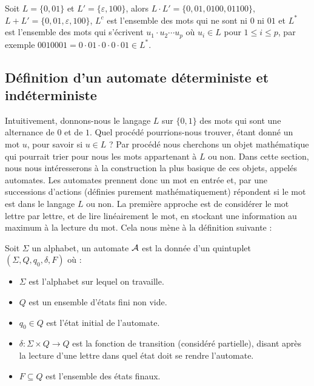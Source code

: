 \begin{expl}
    Soit $L = \{0,01\}$ et $L' = \{\varepsilon,100\}$, alors $L\cdot L' = \{0,01,0100,01100\}$, $L+L' = \{0,01,\varepsilon,100\}$, $L^c$ est l'ensemble des mots qui ne sont ni $0$ ni $01$ et $L^*$ est l'ensemble des mots qui s'écrivent $u_1\cdot u_2\cdots u_p$ où $u_i\in L$ pour $1\leq i \leq p$, par exemple $0010001 = 0\cdot 01 \cdot 0\cdot 0 \cdot 01 \in L^*$.
\end{expl}

\subsection{Définition d'un automate déterministe et indéterministe}

Intuitivement, donnons-nous le langage $L$ sur $\{0,1\}$ des mots qui sont une alternance de $0$ et de $1$. Quel procédé pourrions-nous trouver, étant donné un mot $u$, pour savoir si $u\in L$ ? Par procédé nous cherchons un objet mathématique qui pourrait trier pour nous les mots appartenant à $L$ ou non. Dans cette section, nous nous intéresserons à la construction la plus basique de ces objets, appelés automates. Les automates prennent donc un mot en entrée et, par une successions d'actions (définies purement mathématiquement) répondent si le mot est dans le langage $L$ ou non. La première approche est de considérer le mot lettre par lettre, et de \og lire\fg{} linéairement le mot, en stockant une information au maximum à la lecture du mot. Cela nous mène à la définition suivante :

\begin{defi}
    Soit $\Sigma$ un alphabet, un automate $\mathcal A$ est la donnée d'un quintuplet $(\Sigma,Q,q_0,\delta,F)$ où :
    \begin{itemize}[label=$\bullet$]
        \item $\Sigma$ est l'alphabet sur lequel on travaille.
        \item $Q$ est un ensemble d'états fini non vide.
        \item $q_0 \in Q$ est l'état initial de l'automate.
        \item $\delta : \Sigma \times Q \to Q$ est la fonction de transition (considéré partielle), disant après la lecture d'une lettre dans quel état doit se rendre l'automate.
        \item $F\subseteq Q$ est l'ensemble des états finaux.
    \end{itemize}
\end{defi}

